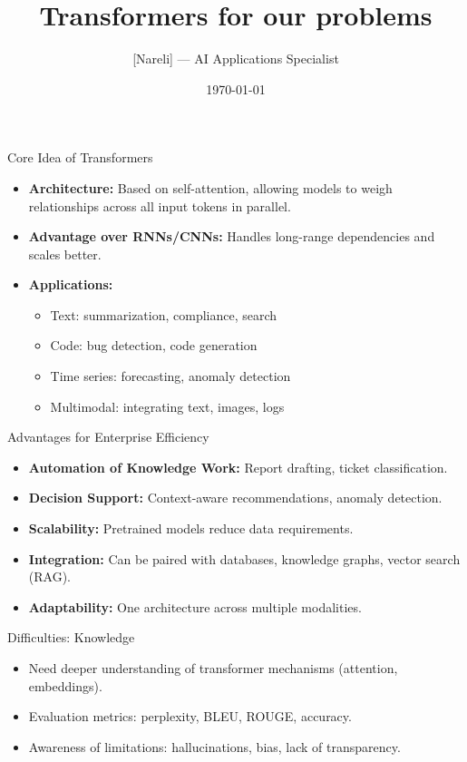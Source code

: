 \documentclass{beamer}
\title{Transformers for our problems}
\author{[Nareli] --- AI Applications Specialist}
\date{\today}
\begin{document}
\frame{\titlepage}

\begin{frame}{Core Idea of Transformers}
\begin{itemize}
    \item \textbf{Architecture:} Based on self-attention, allowing models to weigh relationships across all input tokens in parallel.
    \item \textbf{Advantage over RNNs/CNNs:} Handles long-range dependencies and scales better.
    \item \textbf{Applications:}
    \begin{itemize}
        \item Text: summarization, compliance, search
        \item Code: bug detection, code generation
        \item Time series: forecasting, anomaly detection
        \item Multimodal: integrating text, images, logs
    \end{itemize}
\end{itemize}
\end{frame}


\begin{frame}{Advantages for Enterprise Efficiency}
\begin{itemize}
    \item \textbf{Automation of Knowledge Work:} Report drafting, ticket classification.
    \item \textbf{Decision Support:} Context-aware recommendations, anomaly detection.
    \item \textbf{Scalability:} Pretrained models reduce data requirements.
    \item \textbf{Integration:} Can be paired with databases, knowledge graphs, vector search (RAG).
    \item \textbf{Adaptability:} One architecture across multiple modalities.
\end{itemize}
\end{frame}


\begin{frame}{Difficulties: Knowledge}
\begin{itemize}
    \item Need deeper understanding of transformer mechanisms (attention, embeddings).
    \item Evaluation metrics: perplexity, BLEU, ROUGE, accuracy.
    \item Awareness of limitations: hallucinations, bias, lack of transparency.
\end{itemize}
\end{frame}
\end{document}
